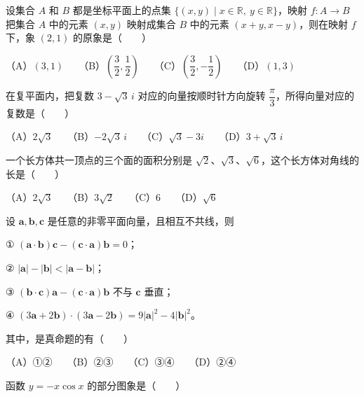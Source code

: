 \begin{question}
设集合 $A$ 和 $B$ 都是坐标平面上的点集 $\{(x,y)\mid x\in\mathbb R,\ y\in\mathbb R\}$，映射 $f:A\to B$ 把集合 $A$ 中的元素 $(x,y)$ 映射成集合 $B$ 中的元素 $(x+y,x-y)$，则在映射 $f$ 下，象 $(2,1)$ 的原象是\mbox{（　　）}

（A）$(3,1)$　　（B）$\left(\dfrac32,\dfrac12\right)$　　（C）$\left(\dfrac32,-\dfrac12\right)$　　（D）$(1,3)$

\end{question}
\begin{question}
在复平面内，把复数 $3-\sqrt3\,i$ 对应的向量按顺时针方向旋转 $\dfrac\pi3$，所得向量对应的复数是\mbox{（　　）}

（A）$2\sqrt3$　　（B）$-2\sqrt3\,i$　　（C）$\sqrt3-3i$　　（D）$3+\sqrt3\,i$

\end{question}
\begin{question}
一个长方体共一顶点的三个面的面积分别是 $\sqrt2$、$\sqrt3$、$\sqrt6$，这个长方体对角线的长是\mbox{（　　）}

（A）$2\sqrt3$　　（B）$3\sqrt2$　　（C）6　　（D）$\sqrt6$

\end{question}
\begin{question}
设 $\boldsymbol a,\boldsymbol b,\boldsymbol c$ 是任意的非零平面向量，且相互不共线，则

① $(\boldsymbol a\cdot\boldsymbol b)\boldsymbol c-(\boldsymbol c\cdot\boldsymbol a)\boldsymbol b=0$；

② $|\boldsymbol a|-|\boldsymbol b|<|\boldsymbol a-\boldsymbol b|$；

③ $(\boldsymbol b\cdot\boldsymbol c)\boldsymbol a-(\boldsymbol c\cdot\boldsymbol a)\boldsymbol b$ 不与 $\boldsymbol c$ 垂直；

④ $(3\boldsymbol a+2\boldsymbol b)\cdot(3\boldsymbol a-2\boldsymbol b)=9|\boldsymbol a|^2-4|\boldsymbol b|^2$。

其中，是真命题的有\mbox{（　　）}

（A）①②　　（B）②③　　（C）③④　　（D）②④

\Needspace{0.4\textheight}
\end{question}
\begin{question}
函数 $y=-x\cos x$ 的部分图象是\mbox{（　　）}
\nopagebreak[4]
\begin{center}\end{center}
\nopagebreak[4]
\end{question}
